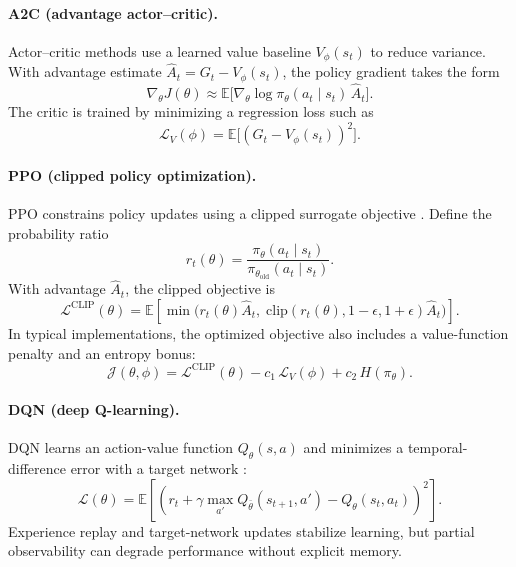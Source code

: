 \documentclass[11pt]{article}
\begin{document}
\paragraph{A2C (advantage actor--critic).}
Actor--critic methods use a learned value baseline $V_\phi(s_t)$ to reduce variance. With advantage estimate $\hat{A}_t=G_t-V_\phi(s_t)$, the policy gradient takes the form
\begin{equation}
\nabla_\theta J(\theta) \approx \mathbb{E}\big[\nabla_\theta\log\pi_\theta(a_t\mid s_t)\,\hat{A}_t\big].
\end{equation}
The critic is trained by minimizing a regression loss such as
\begin{equation}
\mathcal{L}_V(\phi)=\mathbb{E}\big[(G_t - V_\phi(s_t))^2\big].
\end{equation}

\paragraph{PPO (clipped policy optimization).}
PPO constrains policy updates using a clipped surrogate objective \parencite{Schulman2017PPO}. Define the probability ratio
\begin{equation}
 r_t(\theta)=\frac{\pi_\theta(a_t\mid s_t)}{\pi_{\theta_{\mathrm{old}}}(a_t\mid s_t)}.
\end{equation}
With advantage $\hat{A}_t$, the clipped objective is
\begin{equation}
\mathcal{L}^{\mathrm{CLIP}}(\theta)=\mathbb{E}\left[\min\Big(r_t(\theta)\hat{A}_t,\;\mathrm{clip}(r_t(\theta),1-\epsilon,1+\epsilon)\hat{A}_t\Big)\right].
\end{equation}
In typical implementations, the optimized objective also includes a value-function penalty and an entropy bonus:
\begin{equation}
\mathcal{J}(\theta,\phi)=\mathcal{L}^{\mathrm{CLIP}}(\theta) - c_1\,\mathcal{L}_V(\phi) + c_2\,H(\pi_\theta).
\end{equation}

\paragraph{DQN (deep Q-learning).}
DQN learns an action-value function $Q_\theta(s,a)$ and minimizes a temporal-difference error with a target network \parencite{Mnih2015DQN}:
\begin{equation}
\mathcal{L}(\theta)=\mathbb{E}\left[\left(r_t + \gamma\max_{a'}Q_{\bar\theta}(s_{t+1},a') - Q_\theta(s_t,a_t)\right)^2\right].
\end{equation}
Experience replay and target-network updates stabilize learning, but partial observability can degrade performance without explicit memory.
\end{document}
